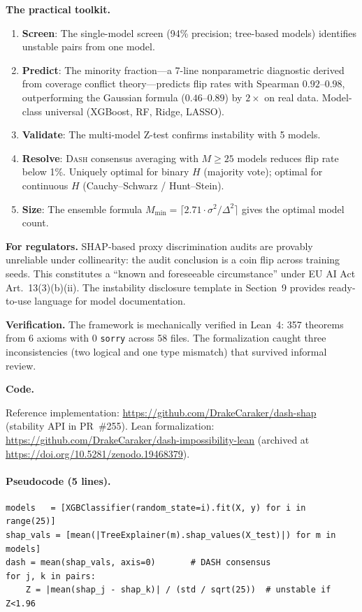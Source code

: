 \documentclass{article}
\newcommand{\DASH}{\textsc{Dash}}
\begin{document}
\noindent\textbf{The practical toolkit.}
\begin{enumerate}
    \item \textbf{Screen}: The single-model screen (94\% precision; tree-based models) identifies unstable pairs from one model.
    \item \textbf{Predict}: The minority fraction---a 7-line nonparametric diagnostic derived from coverage conflict theory---predicts flip rates with Spearman $0.92$--$0.98$, outperforming the Gaussian formula ($0.46$--$0.89$) by $2\times$ on real data. Model-class universal (XGBoost, RF, Ridge, LASSO).
    \item \textbf{Validate}: The multi-model Z-test confirms instability with 5 models.
    \item \textbf{Resolve}: \DASH{} consensus averaging with $M \geq 25$ models reduces flip rate below 1\%. Uniquely optimal for binary $H$ (majority vote); optimal for continuous $H$ (Cauchy--Schwarz / Hunt--Stein).
    \item \textbf{Size}: The ensemble formula $M_{\min} = \lceil 2.71 \cdot \sigma^2/\Delta^2 \rceil$ gives the optimal model count.
\end{enumerate}

\noindent\textbf{For regulators.} SHAP-based proxy discrimination audits are provably unreliable under collinearity: the audit conclusion is a coin flip across training seeds. This constitutes a ``known and foreseeable circumstance'' under EU AI Act Art.~13(3)(b)(ii). The instability disclosure template in Section~9 provides ready-to-use language for model documentation.

\noindent\textbf{Verification.} The framework is mechanically verified in Lean~4: 357 theorems from 6 axioms with 0 \texttt{sorry} across 58 files. The formalization caught three inconsistencies (two logical and one type mismatch) that survived informal review.

\noindent\textbf{Code.}
\begin{sloppypar}
\noindent Reference implementation:
\url{https://github.com/DrakeCaraker/dash-shap} (stability API in PR~\#255).
Lean formalization:
\url{https://github.com/DrakeCaraker/dash-impossibility-lean} (archived at \url{https://doi.org/10.5281/zenodo.19468379}).
\end{sloppypar}

\paragraph{Pseudocode (5 lines).}
{\small\begin{verbatim}
models   = [XGBClassifier(random_state=i).fit(X, y) for i in range(25)]
shap_vals = [mean(|TreeExplainer(m).shap_values(X_test)|) for m in models]
dash = mean(shap_vals, axis=0)       # DASH consensus
for j, k in pairs:
    Z = |mean(shap_j - shap_k)| / (std / sqrt(25))  # unstable if Z<1.96
\end{verbatim}}
\end{document}
